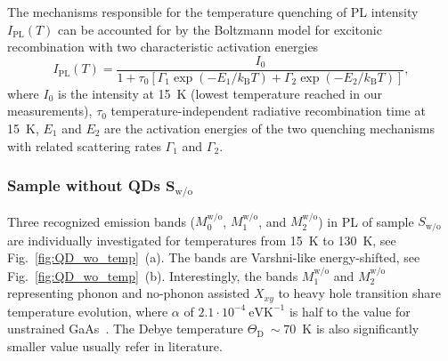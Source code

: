 The mechanisms responsible for the temperature quenching of PL intensity $I_\mathrm{PL}(T)$ can be accounted for by the Boltzmann model for excitonic recombination with two characteristic activation energies~\citep{Daly_prb1995, Alen_apl2011}
\begin{equation}
I_\mathrm{PL}(T)=\frac{I_0}{1+\tau_0\left[\Gamma_1\exp(-E_1/k_\mathrm{B}T)+\Gamma_2\exp(-E_2/k_\mathrm{B}T)\right]},               \label{eq:Arhenius}
\end{equation}
where $I_0$ is the intensity at 15~K (lowest temperature reached in our measurements), $\tau_0$ temperature-independent radiative recombination time at 15~K, $E_1$ and $E_2$ are the activation energies of the two quenching mechanisms with related scattering rates $\Gamma_1$ and $\Gamma_2$.%
\newpage
\subsubsection*{Sample without QDs $\mathbf{S_\mathrm{w/o}}$}
%
Three recognized emission bands ($M_0^\mathrm{w/o}$, $M_1^\mathrm{w/o}$, and $M_2^\mathrm{w/o}$) in PL of sample ${S_\mathrm{w/o}}$ are individually investigated for temperatures from 15~K to 130~K, see Fig.~\ref{fig:QD_wo_temp}~(a). The bands are  Varshni-like energy-shifted,
see Fig.~\ref{fig:QD_wo_temp}~(b). Interestingly, the bands $M_1^\mathrm{w/o}$ and $M_2^\mathrm{w/o}$ representing phonon and no-phonon assisted $X_{xy}$ to heavy hole transition share temperature evolution, where $\alpha$ of $2.1\cdot10^{-4}~\mathrm{eVK^{-1}}$ is half to the value for unstrained GaAs~\cite{ioffe, Vurgaftman}. The Debye temperature $\Theta_\mathrm{D}~\sim70$~K is also significantly smaller value usually refer in literature.

